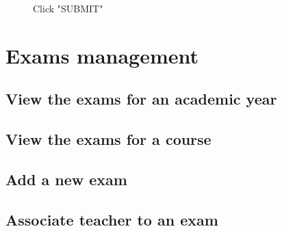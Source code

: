\documentclass[ManualeUtente]{subfiles}
\begin{document}
\begin{enumerate}
	\begin{figure}[H]
		\centering
		\caption{Click "SUBMIT"}
		\label{fig:Click "SUBMIT"}
	\end{figure}
\end{enumerate}

\section{Exams management}
\subsection{View the exams for an academic year}
\subsection{View the exams for a course}
\subsection{Add a new exam}
\subsection{Associate teacher to an exam}
\end{document}
